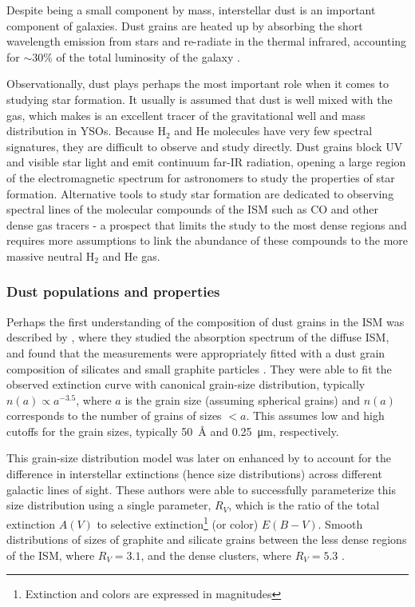 Despite being a small component by mass, interstellar dust is an important component of galaxies. Dust grains are heated up by absorbing the short wavelength emission from stars and re-radiate in the thermal infrared, accounting for $\sim 30\%$ of the total luminosity of the galaxy \citep{Mathis:1990jk}. 

Observationally, dust plays perhaps the most important role when it comes to studying star formation. It usually is assumed that dust is well mixed with the gas, which makes is an excellent tracer of the gravitational well and mass distribution in YSOs. Because H$_2$ and He molecules have very few spectral signatures, they are difficult to observe and study directly. Dust grains block UV and visible star light and emit continuum far-IR radiation, opening a large region of the electromagnetic spectrum for astronomers to study the properties of star formation. Alternative tools to study star formation are dedicated to observing spectral lines of the molecular compounds of the ISM such as CO and other dense gas tracers - a prospect that limits the study to the most dense regions and requires more assumptions to link the abundance of these compounds to the more massive neutral H$_2$ and He gas.


\subsubsection{Dust populations and properties}


Perhaps the first understanding of the composition of dust grains in the ISM was described by \cite{Mathis:1977hp}, where they studied the absorption spectrum of the diffuse ISM, and found that the measurements were appropriately fitted with a dust grain composition of silicates and small graphite particles \citep{Stecher:1965eq}. They were able to fit the observed extinction curve with canonical grain-size distribution, typically $n(a) \propto a^{-3.5}$, where $a$ is the grain size (assuming spherical grains) and $n(a)$ corresponds to the number of grains of sizes $<a$. This assumes low and high cutoffs for the grain sizes, typically \SI{50}{\angstrom} and \SI{0.25}{\micro\meter}, respectively.

This grain-size distribution model was later on enhanced by \cite{Cardelli:1989dp} to account for the difference in interstellar extinctions (hence size distributions) across different galactic lines of sight. These authors were able to successfully parameterize this size distribution using a single parameter, $R_V$, which is the ratio of the total extinction $A(V)$ to selective extinction\footnote{Extinction and colors are expressed in magnitudes} (or color) $E(B-V)$. Smooth distributions of sizes of graphite and silicate grains between the less dense regions of the ISM, where $R_V = 3.1$, and the dense clusters, where $R_V = 5.3$ \citep{Kim:1994iu}. 


